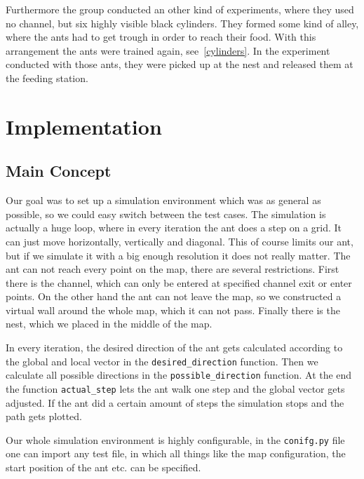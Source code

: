 \documentclass[11pt]{article}
\begin{document}
	Furthermore the group conducted an other kind of experiments, where they used no channel, but six highly visible black cylinders. They formed some kind of alley, where the ants had to get trough in order to reach their food. With this arrangement the ants were trained again, see~\vref{cylinders}. In the experiment conducted with those ants, they were picked up at the nest and released them at the feeding station.
		



\section{Implementation} %
	\subsection{Main Concept}
		Our goal was to set up a simulation environment which was as general as possible, so we could easy switch between the test cases. The simulation is actually a huge loop, where in every iteration the ant does a step on a grid. It can just move horizontally, vertically and diagonal. This of course limits our ant, but if we simulate it with a big enough resolution it does not really matter. The ant can not reach every point on the map, there are several restrictions. First there is the channel, which can only be entered at specified channel exit or enter points. On the other hand the ant can not leave the map, so we constructed a virtual wall around the whole map, which it can not pass. Finally there is the nest, which we placed in the middle of the map.

In every iteration, the desired direction of the ant gets calculated according to the global and local vector in the \texttt{desired\_direction} function. Then we calculate all possible directions in the \texttt{possible\_direction} function. At the end the function \texttt{actual\_step} lets the ant walk one step and the global vector gets adjusted. If the ant did a certain amount of steps the simulation stops and the path gets plotted.

Our whole simulation environment is highly configurable, in the \texttt{conifg.py} file one can import any test file, in which all things like the map configuration, the start position of the ant etc. can be specified.
\end{document}
